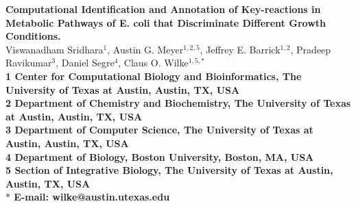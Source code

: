 \documentclass[12pt]{article}
\date{}
\begin{document}
\begin{flushleft}
{\Large
\textbf{Computational Identification and Annotation of Key-reactions in Metabolic Pathways of E. coli that Discriminate Different Growth Conditions.}
}
\bigskip
\noindent
\\
Viswanadham Sridhara$^{1}$,
Austin G. Meyer$^{1,2,5}$, 
Jeffrey E. Barrick$^{1,2}$,
Pradeep Ravikumar$^{3}$,
Daniel Segre$^{4}$, 
Claus O. Wilke$^{1,5,\ast}$
\\
\bigskip
\bf{1} Center for Computational Biology and Bioinformatics, The University of Texas at Austin, Austin, TX, USA
\\
\bf{2} Department of Chemistry and Biochemistry, The University of Texas at Austin, Austin, TX, USA
\\
\bf{3} Department of Computer Science, The University of Texas at Austin, Austin, TX, USA
\\
\bf{4} Department of Biology, Boston University, Boston, MA, USA
\\
\bf{5} Section of Integrative Biology, The University of Texas at Austin, Austin, TX, USA
\\
\bigskip
$\ast$ E-mail: wilke@austin.utexas.edu
\end{flushleft}
\newpage
\end{document}
